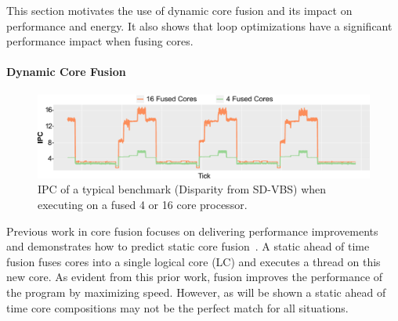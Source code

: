 This section motivates the use of dynamic core fusion and its impact on performance and energy.
It also shows that loop optimizations have a significant performance impact when fusing cores.

\paragraph{Dynamic Core Fusion}
\begin{figure}[t]
    \centering
    \includegraphics[width=\textwidth]{cases-paper/graphics/motivation/disp_opt_4_16_3.pdf}
    \caption{IPC of a typical benchmark (Disparity from SD-VBS) when executing on a fused 4 or 16 core processor.} 
    \label{fig:disp_ex}
	\vspace{1em}
\end{figure}

Previous work in core fusion focuses on delivering performance improvements~\cite{ipek2007CoreFusion,kim2007tflex} and demonstrates how to predict static core fusion~\cite{micolet2016dmpstream}.
A static ahead of time fusion fuses cores into a single logical core (LC) and executes a thread on this new core.
As evident from this prior work, fusion improves the performance of the program by maximizing speed.
However, as will be shown a static ahead of time core compositions may not be the perfect match for all situations.

